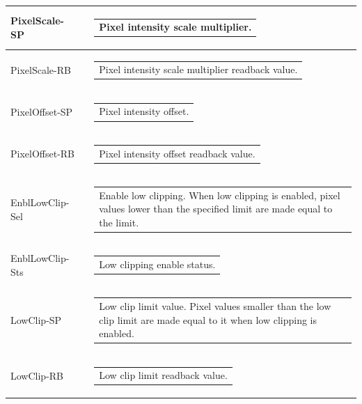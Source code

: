 \documentclass[openany]{article}
\begin{document}
\begin{longtable}{| m{3.0cm} m{4.5cm} m{7.0cm} |}
        PixelScale-SP &  & \begin{tabular}{@{}m{6cm}@{}}
                Pixel intensity scale multiplier.
            \end{tabular} \\ \hline
        PixelScale-RB &  & \begin{tabular}{@{}m{6cm}@{}}
                Pixel intensity scale multiplier readback value.
            \end{tabular} \hypertarget{pv:pixel-offset}{}\\ \hline
        PixelOffset-SP &  & \begin{tabular}{@{}m{6cm}@{}}
                Pixel intensity offset.
            \end{tabular} \\ \hline
        PixelOffset-RB &  & \begin{tabular}{@{}m{6cm}@{}}
                Pixel intensity offset readback value.
            \end{tabular} \hypertarget{pv:enbl-low-clip}{}\\ \hline
        EnblLowClip-Sel &  & \begin{tabular}{@{}m{6cm}@{}}
                Enable low clipping. When low clipping is enabled,
                pixel values lower than the specified limit are made equal to the
                limit.
            \end{tabular} \\ \hline
        EnblLowClip-Sts &  & \begin{tabular}{@{}m{6cm}@{}}
                Low clipping enable status.
            \end{tabular} \hypertarget{pv:low-clip}{}\\ \hline
        LowClip-SP &  & \begin{tabular}{@{}m{6cm}@{}}
                Low clip limit value. Pixel values smaller than the low
                clip limit are made equal to it when low clipping is enabled.
            \end{tabular} \\ \hline
        LowClip-RB &  & \begin{tabular}{@{}m{6cm}@{}}
	        Low clip limit readback value.
            \end{tabular} \hypertarget{pv:enbl-high-clip}{}\\ \hline

\end{longtable}
\end{document}
